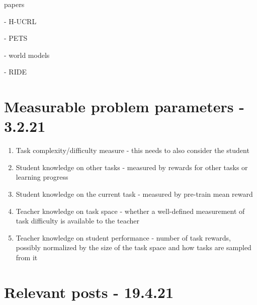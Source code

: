 \documentclass[letterpaper]{article}
\theoremstyle{definition}
\begin{document}
papers

\cite{Curi2020} - H-UCRL

\cite{Chua2018} - PETS

\cite{Ha2018} - world models

\cite{Raileanu2020} - RIDE

\section{Measurable problem parameters - 3.2.21} \label{sec:experiments}

\begin{enumerate}
	\item Task complexity/difficulty measure - this needs to also consider the student
	\item Student knowledge on other tasks - measured by rewards for other tasks or learning progress
	\item Student knowledge on the current task - measured by pre-train mean reward
	\item Teacher knowledge on task space - whether a well-defined measurement of task difficulty is available to the teacher
	\item Teacher knowledge on student performance - number of task rewards, possibly normalized by the size of the task space and how tasks are sampled from it
\end{enumerate}

\section{Relevant posts - 19.4.21} \label{sec:blogs}
\end{document}
